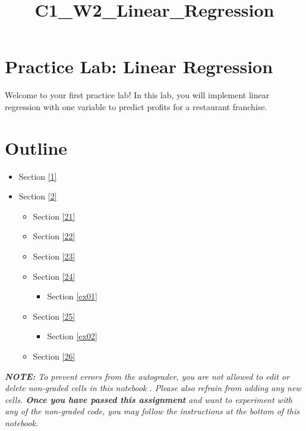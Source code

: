 \documentclass[11pt]{article}
\title{C1\_W2\_Linear\_Regression}
\providecommand{\tightlist}{%
      \setlength{\itemsep}{0pt}\setlength{\parskip}{0pt}}
\begin{document}
    
    \maketitle
    
    

    
    \hypertarget{practice-lab-linear-regression}{%
\section{Practice Lab: Linear
Regression}\label{practice-lab-linear-regression}}

Welcome to your first practice lab! In this lab, you will implement
linear regression with one variable to predict profits for a restaurant
franchise.

\hypertarget{outline}{%
\section{Outline}\label{outline}}

\begin{itemize}
\tightlist
\item
  Section \ref{1}
\item
  Section \ref{2}

  \begin{itemize}
  \tightlist
  \item
    Section \ref{21}
  \item
    Section \ref{22}
  \item
    Section \ref{23}
  \item
    Section \ref{24}

    \begin{itemize}
    \tightlist
    \item
      Section \ref{ex01}
    \end{itemize}
  \item
    Section \ref{25}

    \begin{itemize}
    \tightlist
    \item
      Section \ref{ex02}
    \end{itemize}
  \item
    Section \ref{26}
  \end{itemize}
\end{itemize}

    \emph{\textbf{NOTE:} To prevent errors from the autograder, you are not
allowed to edit or delete non-graded cells in this notebook . Please
also refrain from adding any new cells. \textbf{Once you have passed
this assignment} and want to experiment with any of the non-graded code,
you may follow the instructions at the bottom of this notebook.}
\end{document}
